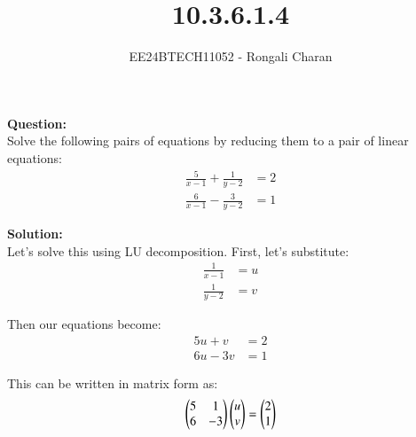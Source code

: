 \documentclass[journal]{IEEEtran}
\begin{document}

\vspace{3cm}

\title{10.3.6.1.4}
\author{EE24BTECH11052 - Rongali Charan}
 \maketitle
{\let\newpage\relax\maketitle}

\renewcommand{\thefigure}{\theenumi}
\renewcommand{\thetable}{\theenumi}
\setlength{\intextsep}{10pt} %


\renewcommand{\thetable}{\theenumi}


\textbf{Question:}\\
Solve the following pairs of equations by reducing them to a pair of linear equations:
\begin{align*}
    \frac{5}{x-1} + \frac{1}{y-2} &= 2\\
    \frac{6}{x-1} - \frac{3}{y-2} &= 1
\end{align*}

\textbf{Solution:}\\
Let's solve this using LU decomposition. First, let's substitute:
\begin{align}
    \frac{1}{x-1} &= u\\
    \frac{1}{y-2} &= v
\end{align}

Then our equations become:
\begin{align}
    5u + v &= 2 \label{eq1}\\
    6u - 3v &= 1 \label{eq2}
\end{align}

This can be written in matrix form as:
\begin{align}
    \begin{pmatrix}5 & 1\\6 & -3\end{pmatrix}\begin{pmatrix}u\\v\end{pmatrix} = \begin{pmatrix}2\\1\end{pmatrix}
\end{align}
\end{document}
